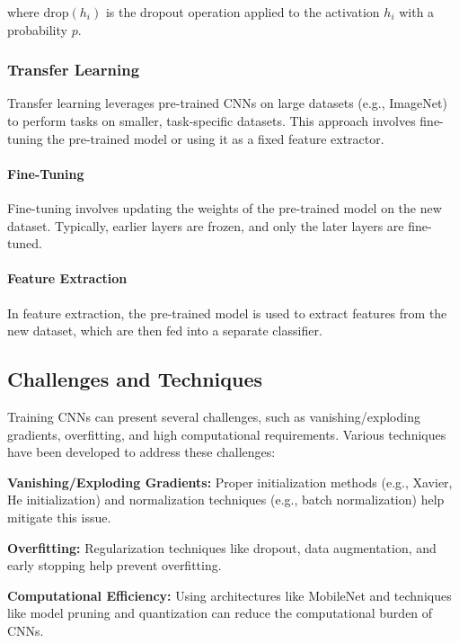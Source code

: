 \documentclass[12pt]{article}
\begin{document}
where \( \text{drop}(h_i) \) is the dropout operation applied to the activation \( h_i \) with a probability \( p \).

\subsubsection{Transfer Learning}

Transfer learning leverages pre-trained CNNs on large datasets (e.g., ImageNet) to perform tasks on smaller, task-specific datasets. This approach involves fine-tuning the pre-trained model or using it as a fixed feature extractor.

\paragraph{Fine-Tuning}

Fine-tuning involves updating the weights of the pre-trained model on the new dataset. Typically, earlier layers are frozen, and only the later layers are fine-tuned.

\paragraph{Feature Extraction}

In feature extraction, the pre-trained model is used to extract features from the new dataset, which are then fed into a separate classifier.

\subsection{Challenges and Techniques}

Training CNNs can present several challenges, such as vanishing/exploding gradients, overfitting, and high computational requirements. Various techniques have been developed to address these challenges:

\textbf{Vanishing/Exploding Gradients:} Proper initialization methods (e.g., Xavier, He initialization) and normalization techniques (e.g., batch normalization) help mitigate this issue.

\textbf{Overfitting:} Regularization techniques like dropout, data augmentation, and early stopping help prevent overfitting.

\textbf{Computational Efficiency:} Using architectures like MobileNet and techniques like model pruning and quantization can reduce the computational burden of CNNs.
\end{document}
